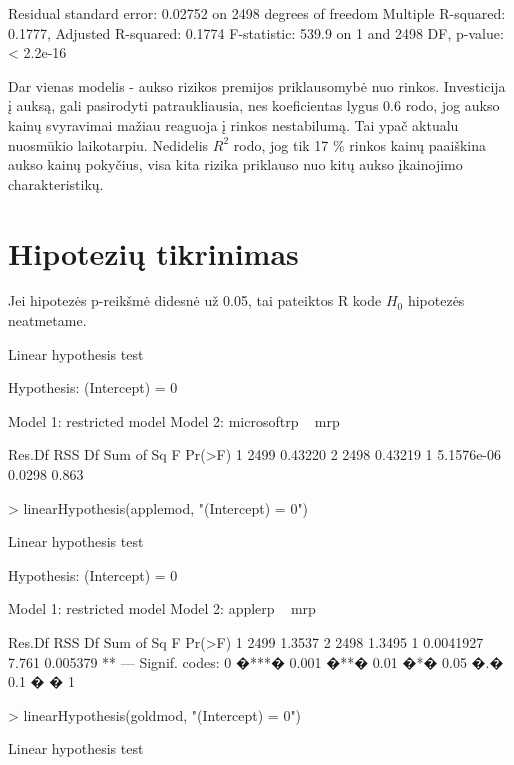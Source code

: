 \documentclass[a4paper]{article}
\begin{document}
\begin{Schunk}
\begin{Soutput}
Residual standard error: 0.02752 on 2498 degrees of freedom
Multiple R-squared: 0.1777,	Adjusted R-squared: 0.1774 
F-statistic: 539.9 on 1 and 2498 DF,  p-value: < 2.2e-16 
\end{Soutput}

Dar vienas modelis - aukso rizikos premijos priklausomybė nuo rinkos. Investicija į auksą, gali pasirodyti patraukliausia, 
nes koeficientas lygus 0.6 rodo, jog aukso kainų svyravimai mažiau reaguoja į rinkos nestabilumą. Tai ypač aktualu nuosmūkio laikotarpiu. Nedidelis $R^2$ rodo, jog tik 17 \% rinkos kainų paaiškina aukso kainų pokyčius, visa kita rizika priklauso nuo kitų aukso įkainojimo charakteristikų.

\section{Hipotezių tikrinimas}
Jei hipotezės p-reikšmė didesnė už 0.05, tai pateiktos R kode $H_0$ hipotezės neatmetame. 


\begin{Soutput}
Linear hypothesis test

Hypothesis:
(Intercept) = 0

Model 1: restricted model
Model 2: microsoftrp ~ mrp

  Res.Df     RSS Df  Sum of Sq      F Pr(>F)
1   2499 0.43220                            
2   2498 0.43219  1 5.1576e-06 0.0298  0.863
\end{Soutput}
\begin{Sinput}
> linearHypothesis(applemod, "(Intercept) = 0")
\end{Sinput}
\begin{Soutput}
Linear hypothesis test

Hypothesis:
(Intercept) = 0

Model 1: restricted model
Model 2: applerp ~ mrp

  Res.Df    RSS Df Sum of Sq     F   Pr(>F)   
1   2499 1.3537                               
2   2498 1.3495  1 0.0041927 7.761 0.005379 **
---
Signif. codes:  0 �***� 0.001 �**� 0.01 �*� 0.05 �.� 0.1 � � 1 
\end{Soutput}
\begin{Sinput}
> linearHypothesis(goldmod, "(Intercept) = 0")
\end{Sinput}
\begin{Soutput}
Linear hypothesis test


\end{Soutput}
\end{Schunk}
\end{document}
